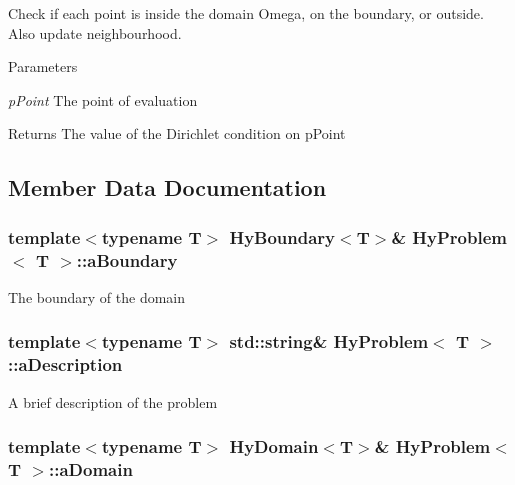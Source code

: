 Check if each point is inside the domain Omega, on the boundary, or outside. Also update neighbourhood. 


\begin{DoxyParams}{Parameters}
\item[{\em pPoint}]The point of evaluation \end{DoxyParams}
\begin{DoxyReturn}{Returns}
The value of the Dirichlet condition on pPoint 
\end{DoxyReturn}


\subsection{Member Data Documentation}
\hypertarget{classHyProblem_af7a46447af3592758cb384ac355a30fd}{
\subsubsection[{aBoundary}]{\setlength{\rightskip}{0pt plus 5cm}template$<$typename T$>$ {\bf HyBoundary}$<$T$>$\& {\bf HyProblem}$<$ T $>$::{\bf aBoundary}}}
\label{classHyProblem_af7a46447af3592758cb384ac355a30fd}
The boundary of the domain \hypertarget{classHyProblem_a9ff58aa13598c448222203cbb0ad6a10}{
\subsubsection[{aDescription}]{\setlength{\rightskip}{0pt plus 5cm}template$<$typename T$>$ std::string\& {\bf HyProblem}$<$ T $>$::{\bf aDescription}}}
\label{classHyProblem_a9ff58aa13598c448222203cbb0ad6a10}
A brief description of the problem \hypertarget{classHyProblem_a245270926a69fef2df91e3aad939fee3}{
\subsubsection[{aDomain}]{\setlength{\rightskip}{0pt plus 5cm}template$<$typename T$>$ {\bf HyDomain}$<$T$>$\& {\bf HyProblem}$<$ T $>$::{\bf aDomain}}}
